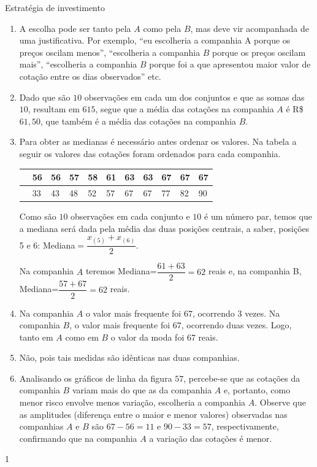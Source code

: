 \begin{answer}{Estratégia de investimento}
{
\begin{enumerate}
\item A escolha pode ser tanto pela $A$ como pela $B$, mas deve vir acompanhada de uma justificativa. Por exemplo, “eu escolheria a companhia A porque os preços oscilam menos”, “escolheria a companhia $B$ porque os preços oscilam mais”, “escolheria a companhia $B$ porque foi a que apresentou maior valor de cotação entre os dias observados”{} etc.

\item Dado que são $10$ observações em cada um dos conjuntos e que as somas das $10$, resultam em $615$, segue que a média das cotações na companhia $A$ é R\$ $61{,}50$, que também é a média das cotações na companhia $B$.

\item Para obter as medianas é necessário antes ordenar os valores. Na tabela a seguir os valores das cotações foram ordenados para cada companhia.


\begin{table}[H]
\centering

\begin{tabular}{|*{11}{f|}}
\hline
{} & 56 & 56 & 57 & 58 & 61 & 63 & 63 & 67 & 67 & 67 \\
\hline
{} & 33 & 43 & 48 & 52 & 57 & 67 & 67 & 77 & 82 & 90 \\
\hline
\end{tabular}
\end{table}

Como são $10$ observações em cada conjunto e $10$ é um número par, temos que a mediana será dada pela média das duas posições centrais, a saber, posições 5 e 6: Mediana$=\dfrac{x_{(5)}+x_{(6)}}{2}$.

Na companhia $A$ teremos Mediana=$\dfrac{61+63}{2}=62$ reais e, na companhia B, Mediana=$\dfrac{57+67}{2}=62$ reais.

\item Na companhia $A$ o valor mais frequente foi $67$, ocorrendo $3$ vezes. Na companhia $B$, o valor mais frequente foi $67$, ocorrendo duas vezes. Logo, tanto em $A$ como em $B$ o valor da moda foi $67$ reais.

\item Não, pois tais medidas são idênticas nas duas companhias.

\item Analisando os gráficos de linha da figura $57$, percebe-se que as cotações da companhia $B$ variam mais do que as da companhia $A$ e, portanto, como menor risco envolve menos variação, escolheria a companhia $A$. Observe que as amplitudes (diferença entre o maior e menor valores) observadas nas companhias $A$ e $B$ são $67-56=11$ e $90-33=57$, respectivamente, confirmando que na companhia $A$ a variação das cotações é menor.
\end{enumerate}
}{1}
\end{answer}

